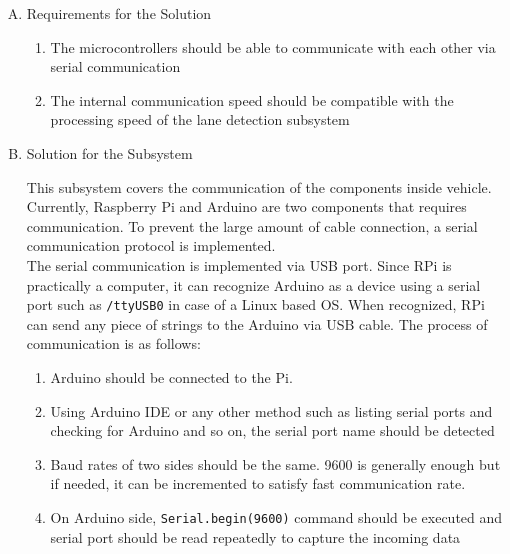 \documentclass[a4paper,12pt]{article}
\begin{document}
\begin{enumerate}[A.]

\item {Requirements for the Solution}


\begin{enumerate}[1)]

\item The microcontrollers should be able to communicate with each other via serial communication

\item The internal communication speed should be compatible with the processing speed of the lane detection subsystem  

\end{enumerate}


\item {Solution for the Subsystem}


This subsystem covers the communication of the components inside vehicle. Currently, Raspberry Pi and Arduino are two components that requires communication. To prevent the large amount of cable connection, a serial communication protocol is implemented. \\


The serial communication is implemented via USB port. Since RPi is practically a computer, it can recognize Arduino as a device using a serial port such as \lstinline|/ttyUSB0| in case of a Linux based OS. When recognized, RPi can send any piece of strings to the Arduino via USB cable. The process of communication is as follows:

\begin{enumerate}

\item Arduino should be connected to the Pi. \vspace{-0.2cm}

\item Using Arduino IDE or any other method such as listing serial ports and checking for Arduino and so on, the serial port name should be detected \vspace{-0.2cm}

\item Baud rates of two sides should be the same. 9600 is generally enough but if needed, it can be incremented to satisfy fast communication rate. \vspace{-0.2cm}

\item On Arduino side, \texttt{Serial.begin(9600)} command should be executed and serial port should be read repeatedly to capture the incoming data \vspace{-0.2cm}


\end{enumerate}
\end{enumerate}
\end{document}
